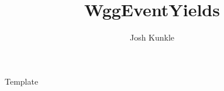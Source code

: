 \documentclass{beamer}
\title[ WggEventYields ]
{ WggEventYields }
\author[Josh Kunkle]
  {Josh Kunkle}
\institute[UMD]{University of Maryland}
\date[January 22, 2014] %
{ 
  \vspace{0.5cm} \begin{center}\texttt{[image: ../UMDLogo.pdf]}\end{center}
  \vspace{0.5cm}
}
\begin{document}
\maketitle

 {

	Template

}
\end{document}
